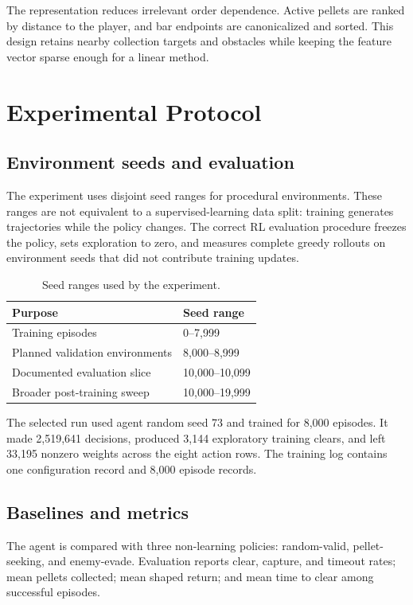 \documentclass[11pt]{article}
\begin{document}
The representation reduces irrelevant order dependence. Active pellets are
ranked by distance to the player, and bar endpoints are canonicalized and
sorted. This design retains nearby collection targets and obstacles while
keeping the feature vector sparse enough for a linear method.

\section{Experimental Protocol}

\subsection{Environment seeds and evaluation}

The experiment uses disjoint seed ranges for procedural environments. These
ranges are not equivalent to a supervised-learning data split: training
generates trajectories while the policy changes. The correct RL evaluation
procedure freezes the policy, sets exploration to zero, and measures complete
greedy rollouts on environment seeds that did not contribute training updates.

\begin{table}[ht]
\centering
\caption{Seed ranges used by the experiment.}
\label{tab:seeds}
\begin{tabular}{ll}
\toprule
Purpose & Seed range \\
\midrule
Training episodes & 0--7,999 \\
Planned validation environments & 8,000--8,999 \\
Documented evaluation slice & 10,000--10,099 \\
Broader post-training sweep & 10,000--19,999 \\
\bottomrule
\end{tabular}
\end{table}

The selected run used agent random seed 73 and trained for 8,000 episodes. It
made 2,519,641 decisions, produced 3,144 exploratory training clears, and
left 33,195 nonzero weights across the eight action rows. The training log
contains one configuration record and 8,000 episode records.

\subsection{Baselines and metrics}

The agent is compared with three non-learning policies: random-valid,
pellet-seeking, and enemy-evade. Evaluation reports clear, capture, and
timeout rates; mean pellets collected; mean shaped return; and mean time to
clear among successful episodes.
\end{document}
